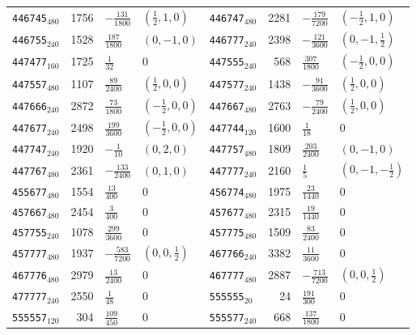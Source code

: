 {\begin{longtable}{@{}lrll@{\hspace{2em}}lrll@{}}
\texttt{446745}$_{480}$ & 1756 & $-\tfrac{131}{1800}$ & $(\tfrac{1}{2},1,0)$ & \texttt{446747}$_{480}$ & 2281 & $-\tfrac{179}{7200}$ & $(-\tfrac{1}{2},1,0)$\\
\texttt{446755}$_{240}$ & 1528 & $\tfrac{187}{1800}$ & $(0,-1,0)$ & \texttt{446777}$_{240}$ & 2398 & $-\tfrac{121}{3600}$ & $(0,-1,\tfrac{1}{2})$\\
\texttt{447477}$_{160}$ & 1725 & $\tfrac{1}{32}$ & 0 & \texttt{447555}$_{240}$ & 568 & $\tfrac{307}{1800}$ & $(-\tfrac{1}{2},0,0)$\\
\texttt{447557}$_{480}$ & 1107 & $\tfrac{89}{2400}$ & $(\tfrac{1}{2},0,0)$ & \texttt{447577}$_{240}$ & 1438 & $-\tfrac{91}{3600}$ & $(\tfrac{1}{2},0,0)$\\
\texttt{447666}$_{240}$ & 2872 & $\tfrac{73}{1800}$ & $(-\tfrac{1}{2},0,0)$ & \texttt{447667}$_{480}$ & 2763 & $-\tfrac{79}{2400}$ & $(\tfrac{1}{2},0,0)$\\
\texttt{447677}$_{240}$ & 2498 & $\tfrac{199}{3600}$ & $(-\tfrac{1}{2},0,0)$ & \texttt{447744}$_{120}$ & 1600 & $\tfrac{1}{18}$ & 0\\
\texttt{447747}$_{240}$ & 1920 & $-\tfrac{1}{10}$ & $(0,2,0)$ & \texttt{447757}$_{480}$ & 1809 & $\tfrac{203}{2400}$ & $(0,-1,0)$\\
\texttt{447767}$_{480}$ & 2361 & $-\tfrac{133}{2400}$ & $(0,1,0)$ & \texttt{447777}$_{240}$ & 2160 & $\tfrac{1}{5}$ & $(0,-1,-\tfrac{1}{2})$\\
\texttt{455677}$_{480}$ & 1554 & $\tfrac{13}{400}$ & 0 & \texttt{456774}$_{480}$ & 1975 & $\tfrac{23}{1440}$ & 0\\
\texttt{457667}$_{480}$ & 2454 & $\tfrac{3}{400}$ & 0 & \texttt{457677}$_{480}$ & 2315 & $\tfrac{19}{1440}$ & 0\\
\texttt{457755}$_{240}$ & 1078 & $\tfrac{299}{3600}$ & 0 & \texttt{457775}$_{480}$ & 1509 & $\tfrac{83}{2400}$ & 0\\
\texttt{457777}$_{480}$ & 1937 & $-\tfrac{583}{7200}$ & $(0,0,\tfrac{1}{2})$ & \texttt{467766}$_{240}$ & 3382 & $\tfrac{11}{3600}$ & 0\\
\texttt{467776}$_{480}$ & 2979 & $\tfrac{13}{2400}$ & 0 & \texttt{467777}$_{480}$ & 2887 & $-\tfrac{713}{7200}$ & $(0,0,\tfrac{1}{2})$\\
\texttt{477777}$_{240}$ & 2550 & $\tfrac{1}{48}$ & 0 & \texttt{555555}$_{20}$ & 24 & $\tfrac{191}{300}$ & 0\\
\texttt{555557}$_{120}$ & 304 & $\tfrac{109}{450}$ & 0 & \texttt{555577}$_{240}$ & 668 & $\tfrac{137}{1800}$ & 0\\

\end{longtable}}
